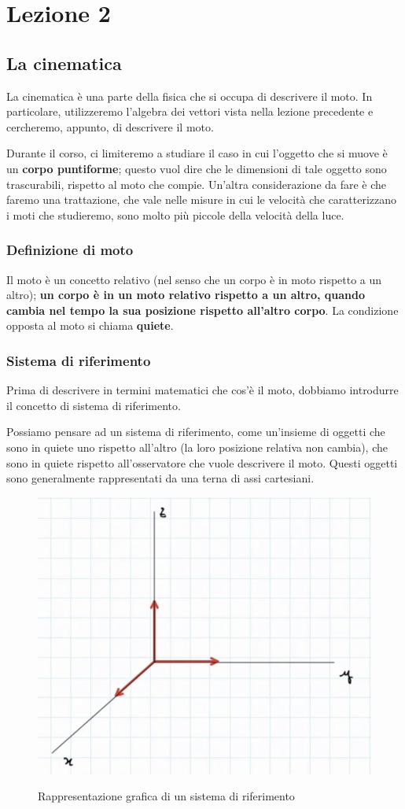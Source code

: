 \chapter{Lezione 2}
\section{La cinematica}
La cinematica è una parte della fisica che si occupa di descrivere il moto. In particolare, utilizzeremo l'algebra dei vettori vista nella lezione precedente e cercheremo, appunto, di descrivere il moto.

Durante il corso, ci limiteremo a studiare il caso in cui l'oggetto che si muove è un \textbf{corpo puntiforme}; questo vuol dire che le dimensioni di tale oggetto sono trascurabili, rispetto al moto che compie. Un'altra considerazione da fare è che faremo una trattazione, che vale nelle misure in cui le velocità che caratterizzano i moti che studieremo, sono molto più piccole della velocità della luce.

\subsection{Definizione di moto}
Il moto è un concetto relativo (nel senso che un corpo è in moto rispetto a un altro); \textbf{un corpo è in un moto relativo rispetto a un altro, quando cambia nel tempo la sua posizione rispetto all'altro corpo}. La condizione opposta al moto si chiama \textbf{quiete}. 

\subsection{Sistema di riferimento}
Prima di descrivere in termini matematici che cos'è il moto, dobbiamo introdurre il concetto di sistema di riferimento.

Possiamo pensare ad un sistema di riferimento, come un'insieme di oggetti che sono in quiete uno rispetto all'altro (la loro posizione relativa non cambia), che sono in quiete rispetto all'osservatore che vuole descrivere il moto. 
\newpage
Questi oggetti sono generalmente rappresentati da una terna di assi cartesiani.

\begin{figure}[h]
\begin{center}
\includegraphics[width = 0.5 \textwidth]{lezione2/images/sistema riferimento1.png}
\label{fig:riferimento1}
\caption{Rappresentazione grafica di un sistema di riferimento}
\end{center}
\end{figure}

